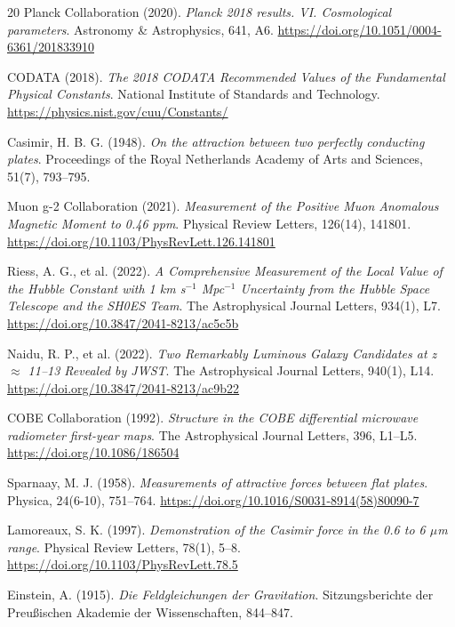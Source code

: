 \begin{thebibliography}{20}
		Planck Collaboration (2020). 
		\textit{Planck 2018 results. VI. Cosmological parameters}. 
		Astronomy \& Astrophysics, 641, A6. 
		\url{https://doi.org/10.1051/0004-6361/201833910}
		
		CODATA (2018). 
		\textit{The 2018 CODATA Recommended Values of the Fundamental Physical Constants}. 
		National Institute of Standards and Technology. 
		\url{https://physics.nist.gov/cuu/Constants/}
		
		Casimir, H. B. G. (1948). 
		\textit{On the attraction between two perfectly conducting plates}. 
		Proceedings of the Royal Netherlands Academy of Arts and Sciences, 51(7), 793--795.
		
		Muon g-2 Collaboration (2021). 
		\textit{Measurement of the Positive Muon Anomalous Magnetic Moment to 0.46 ppm}. 
		Physical Review Letters, 126(14), 141801. 
		\url{https://doi.org/10.1103/PhysRevLett.126.141801}
		
		Riess, A. G., et al. (2022). 
		\textit{A Comprehensive Measurement of the Local Value of the Hubble Constant with 1 km s$^{-1}$ Mpc$^{-1}$ Uncertainty from the Hubble Space Telescope and the SH0ES Team}. 
		The Astrophysical Journal Letters, 934(1), L7. 
		\url{https://doi.org/10.3847/2041-8213/ac5c5b}
		
		Naidu, R. P., et al. (2022). 
		\textit{Two Remarkably Luminous Galaxy Candidates at z $\approx$ 11--13 Revealed by JWST}. 
		The Astrophysical Journal Letters, 940(1), L14. 
		\url{https://doi.org/10.3847/2041-8213/ac9b22}
		
		COBE Collaboration (1992). 
		\textit{Structure in the COBE differential microwave radiometer first-year maps}. 
		The Astrophysical Journal Letters, 396, L1--L5. 
		\url{https://doi.org/10.1086/186504}
		
		Sparnaay, M. J. (1958). 
		\textit{Measurements of attractive forces between flat plates}. 
		Physica, 24(6-10), 751--764. 
		\url{https://doi.org/10.1016/S0031-8914(58)80090-7}
		
		Lamoreaux, S. K. (1997). 
		\textit{Demonstration of the Casimir force in the 0.6 to 6 $\mu$m range}. 
		Physical Review Letters, 78(1), 5--8. 
		\url{https://doi.org/10.1103/PhysRevLett.78.5}
		
		Einstein, A. (1915). 
		\textit{Die Feldgleichungen der Gravitation}. 
		Sitzungsberichte der Preußischen Akademie der Wissenschaften, 844--847.
		
	\end{thebibliography}
